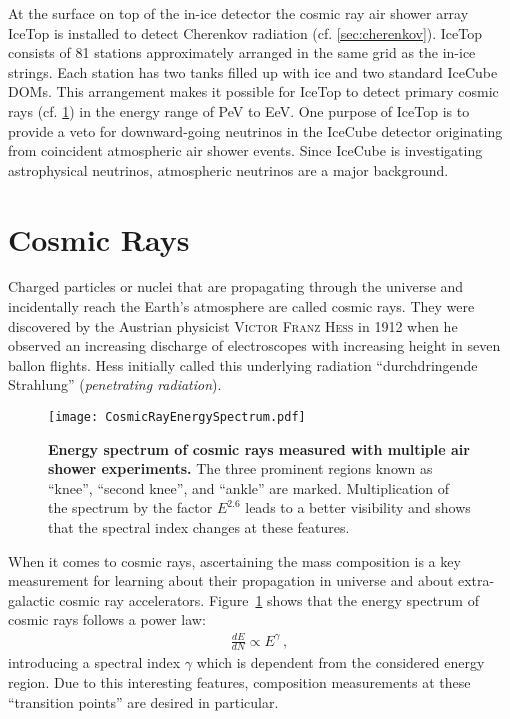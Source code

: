 At the surface on top of the in-ice detector the cosmic ray air shower array IceTop is installed to detect Cherenkov radiation (cf. \ref{sec:cherenkov}). IceTop consists of 81 stations approximately arranged in the same grid as the in-ice strings. Each station has two tanks filled up with ice and two standard IceCube DOMs. This arrangement makes it possible for IceTop to detect primary cosmic rays (cf. \ref{sec:cosmicrays}) in the energy range of \si{\peta\electronvolt} to \si{\exa\electronvolt}. One purpose of IceTop is to provide a veto for downward-going neutrinos in the IceCube detector originating from coincident atmospheric air shower events. \cite{icecube:instrumentation} Since IceCube is investigating astrophysical neutrinos, atmospheric neutrinos are a major background.


\section{Cosmic Rays}\label{sec:cosmicrays}

Charged particles or nuclei that are propagating through the universe and incidentally reach the Earth's atmosphere are called cosmic rays. They were discovered by the Austrian physicist \textsc{Victor Franz Hess} in 1912 when he observed an increasing discharge of electroscopes with increasing height in seven ballon flights. \cite{cosmicrays:hess} Hess initially called this underlying radiation \enquote{durchdringende Strahlung} (\textit{penetrating radiation}).

\begin{figure}[h]
	\texttt{[image: CosmicRayEnergySpectrum.pdf]}
	\caption[Cosmic ray energy spectrum]{\textbf{Energy spectrum of cosmic rays measured with multiple air shower experiments.} \cite[adapted]{cosmicrays:gaisser} The three prominent regions known as \enquote{knee}, \enquote{second knee}, and \enquote{ankle} are marked. Multiplication of the spectrum by the factor $E^{2.6}$ leads to a better visibility and shows that the spectral index changes at these features.}
	\label{cosmicrays:spectrum}	
\end{figure}

When it comes to cosmic rays, ascertaining the mass composition is a key measurement for learning about their propagation in universe and about extra-galactic cosmic ray accelerators. Figure~\ref{cosmicrays:spectrum} shows that the energy spectrum of cosmic rays follows a power law:
\begin{align}
\frac{dE}{dN}\propto E^\gamma\,,
\end{align}
introducing a spectral index $\gamma$ which is dependent from the considered energy region.
Due to this interesting features, composition measurements at these \enquote{transition points} are desired in particular.

